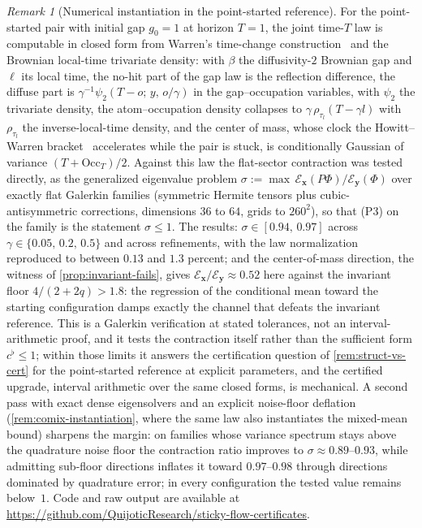 \documentclass[reqno,final,11pt]{amsart}
\theoremstyle{plain}
\theoremstyle{definition}
\theoremstyle{remark}
\newtheorem{remark}[theorem]{Remark}
\newcommand{\cE}{\mathcal E}
\begin{document}
\begin{remark}[Numerical instantiation in the point-started reference]
\label{rem:instantiation}
For the point-started
pair with initial gap $g_0=1$ at horizon $T=1$, the joint time-$T$ law is
computable in closed form from Warren's time-change
construction~\citep{Warren97} and the Brownian local-time trivariate
density: with $\beta$ the diffusivity-$2$ Brownian gap and $\ell$ its
local time, the no-hit part of the gap law is the reflection difference,
the diffuse part is $\gamma^{-1}\psi_2(T-o;\,y,\,o/\gamma)$ in the
gap--occupation variables, with $\psi_2$ the trivariate density, the
atom--occupation density collapses to $\gamma\,\rho_{\tau_l}(T-\gamma l)$
with $\rho_{\tau_l}$ the inverse-local-time density, and the center of
mass, whose clock the Howitt--Warren bracket~\citep{HowittWarren}
accelerates while the pair is stuck, is conditionally Gaussian of
variance $(T+\mathrm{Occ}_T)/2$. Against this law the flat-sector
contraction was tested directly, as the generalized eigenvalue problem
$\sigma:=\max\,\cE_{\mathbf x}(P\Phi)/\cE_{\mathbf y}(\Phi)$ over exactly
flat Galerkin families (symmetric Hermite tensors plus cubic-antisymmetric
corrections, dimensions $36$ to $64$, grids to $260^2$), so that
\textnormal{(P3)} on the family is the statement $\sigma\le1$. The
results: $\sigma\in[0.94,\,0.97]$ across $\gamma\in\{0.05,\,0.2,\,0.5\}$
and across refinements, with the law normalization reproduced to between
$0.13$ and $1.3$ percent; and the center-of-mass direction, the witness of
\cref{prop:invariant-fails}, gives
$\cE_{\mathbf x}/\cE_{\mathbf y}\approx0.52$ here against the invariant
floor $4/(2+2q)>1.8$: the regression of the conditional mean toward the
starting configuration damps exactly the channel that defeats the
invariant reference. This is a Galerkin verification at stated tolerances,
not an interval-arithmetic proof, and it tests the contraction itself
rather than the sufficient form $c^{\flat}\le1$; within those
limits it answers the certification question of \cref{rem:struct-vs-cert}
for the point-started reference at explicit parameters, and the certified
upgrade, interval arithmetic over the same closed forms, is mechanical.
A second pass with exact dense eigensolvers and an explicit noise-floor
deflation (\cref{rem:comix-instantiation}, where the same law also
instantiates the mixed-mean bound) sharpens the margin: on families whose
variance spectrum stays above the quadrature noise floor the contraction
ratio improves to $\sigma\approx0.89$--$0.93$, while admitting sub-floor
directions inflates it toward $0.97$--$0.98$ through directions dominated by
quadrature error; in every configuration the tested value remains below~$1$.
Code and raw output are available at
\url{https://github.com/QuijoticResearch/sticky-flow-certificates}.
\end{remark}
\end{document}
